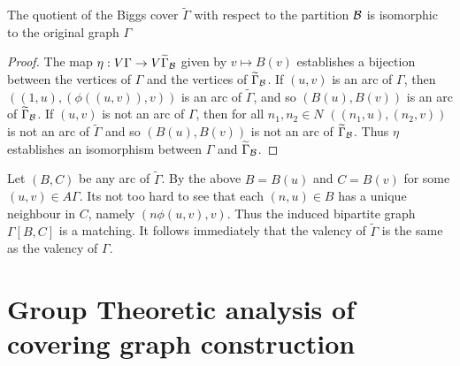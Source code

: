 \begin{proposition}
The quotient of the Biggs cover $\widetilde{\Gamma}$
with respect to the partition $\mathcal{B}$
is isomorphic to the original graph $\Gamma$
\begin{proof}
The map $\eta : V \Gamma \to V \widetilde{\Gamma}_{\mathcal{B}}$ given by
$v \mapsto B(v)$ establishes a bijection between the vertices of $\Gamma$
and the vertices of $\widetilde{\Gamma}_{\mathcal{B}}$.
If $(u,v)$ is an arc of $\Gamma$, then $((1,u),(\phi((u,v)),v))$
is an arc of $\widetilde{\Gamma}$, and so $(B(u), B(v))$
is an arc of $\widetilde{\Gamma}_{\mathcal{B}}$.
If $(u,v)$ is not an arc of $\Gamma$, then for all $n_1, n_2 \in N$
$((n_1, u),(n_2, v))$ is not an arc of $\widetilde{\Gamma}$
and so $(B(u), B(v))$ is not an arc of $\widetilde{\Gamma}_{\mathcal{B}}$.
Thus $\eta$ establishes an isomorphism between
$\Gamma$ and $\widetilde{\Gamma}_{\mathcal{B}}$.

\end{proof}
\end{proposition}
Let $(B,C)$ be any arc of $\widetilde{\Gamma}$.
By the above $B = B(u)$ and $C = B(v)$ for some $(u,v) \in A \Gamma$.
Its not too hard to see that each $(n,u) \in B$
has a unique neighbour in $C$, namely $(n \phi(u,v),v)$.
Thus the induced bipartite graph $\Gamma[B,C]$ is a matching.
It follows immediately that the valency of $\widetilde{\Gamma}$
is the same as the valency of $\Gamma$.

\section{Group Theoretic analysis of covering graph construction}



